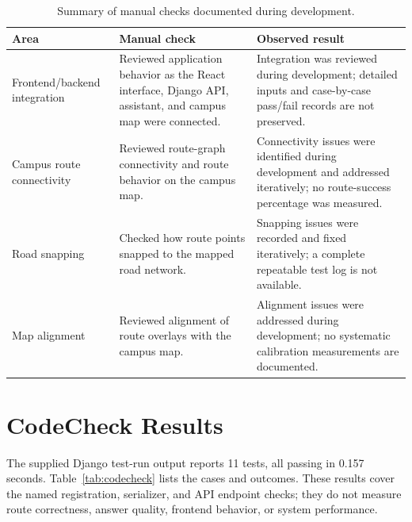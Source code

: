 \documentclass[11pt,a4paper]{report}
\begin{document}
\begin{table}[htbp]
\centering
\small
\begin{tabularx}{\linewidth}{@{}p{3.0cm}p{5.0cm}Y@{}}
\toprule
\textbf{Area} & \textbf{Manual check} & \textbf{Observed result} \\
\midrule
Frontend/backend integration & Reviewed application behavior as the React interface, Django API, assistant, and campus map were connected. & Integration was reviewed during development; detailed inputs and case-by-case pass/fail records are not preserved. \\
Campus route connectivity & Reviewed route-graph connectivity and route behavior on the campus map. & Connectivity issues were identified during development and addressed iteratively; no route-success percentage was measured. \\
Road snapping & Checked how route points snapped to the mapped road network. & Snapping issues were recorded and fixed iteratively; a complete repeatable test log is not available. \\
Map alignment & Reviewed alignment of route overlays with the campus map. & Alignment issues were addressed during development; no systematic calibration measurements are documented. \\
\bottomrule
\end{tabularx}
\caption{Summary of manual checks documented during development.}
\label{tab:manual-checks}
\end{table}

\section{CodeCheck Results}
The supplied Django test-run output reports 11 tests, all passing in 0.157
seconds. Table~\ref{tab:codecheck} lists the cases and outcomes. These results
cover the named registration, serializer, and API endpoint checks; they do not
measure route correctness, answer quality, frontend behavior, or system
performance.
\end{document}

